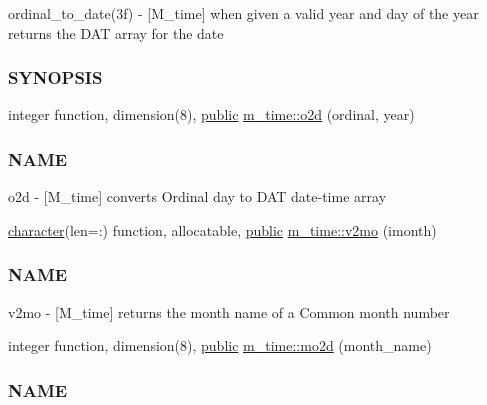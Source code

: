 \begin{DoxyCompactItemize}
\begin{DoxyCompactList}
ordinal\+\_\+to\+\_\+date(3f) -\/ \mbox{[}M\+\_\+time\mbox{]} when given a valid year and day of the year returns the D\+AT array for the date \subsubsection*{S\+Y\+N\+O\+P\+S\+IS}\end{DoxyCompactList}\item 
integer function, dimension(8), \hyperlink{M__stopwatch_83_8txt_a2f74811300c361e53b430611a7d1769f}{public} \hyperlink{namespacem__time_a55e2cb9efc9d4d209ae2864f073d4f19}{m\+\_\+time\+::o2d} (ordinal, year)
\begin{DoxyCompactList}\small\item\em \subsubsection*{N\+A\+ME}

o2d -\/ \mbox{[}M\+\_\+time\mbox{]} converts Ordinal day to D\+AT date-\/time array \end{DoxyCompactList}\item 
\hyperlink{option__stopwatch_83_8txt_abd4b21fbbd175834027b5224bfe97e66}{character}(len=\+:) function, allocatable, \hyperlink{M__stopwatch_83_8txt_a2f74811300c361e53b430611a7d1769f}{public} \hyperlink{namespacem__time_a6f28cf00e4998bb50bb503f5e4bd3f77}{m\+\_\+time\+::v2mo} (imonth)
\begin{DoxyCompactList}\small\item\em \subsubsection*{N\+A\+ME}

v2mo -\/ \mbox{[}M\+\_\+time\mbox{]} returns the month name of a Common month number \end{DoxyCompactList}\item 
integer function, dimension(8), \hyperlink{M__stopwatch_83_8txt_a2f74811300c361e53b430611a7d1769f}{public} \hyperlink{namespacem__time_aa5877b420e38077f159482f214b2dc47}{m\+\_\+time\+::mo2d} (month\+\_\+name)
\begin{DoxyCompactList}\small\item\em \subsubsection*{N\+A\+ME}


\end{DoxyCompactList}
\end{DoxyCompactItemize}
